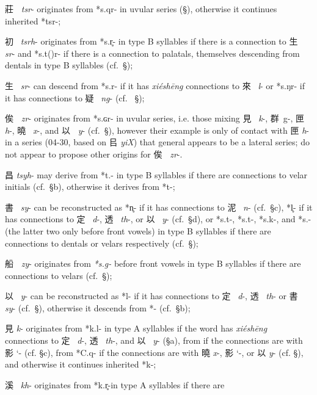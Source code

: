 \begin{description}
莊\textbf{~} \emph{tsr}- originates from *s.q{}r- in uvular
series (§), otherwise it continues inherited *tsr-;
\item
初~ \emph{tsrh}- originates from *s.r̥- in type B syllables if there is a
con­nec­tion to 生~ \emph{sr}- and *s.t{}({})r- if there is a connection to
palatals, themselves descending from dentals in type B syllables
(cf.~§);
\item
生~ \emph{sr}- can descend from *s.r- if it has \emph{xiéshēng
}con­nec­tions to 來~ \emph{l}- or *s.ŋr- if it has con­nec­tions to
疑~ \emph{ng}- (cf. ~§);
\item
俟\textbf{~} \emph{zr}- originates from *s.ɢr- in uvular series,
i.e. those mixing 見~ \emph{k}-, 群~g-, 匣~ \emph{h}-, 曉~ \emph{x}-, and
以\textbf{~} \emph{y}- (cf.~§), however their example is only of
contact with 匣 \emph{h}- in a series (04-30, based on 㠯 \emph{yiX})
that general appears to be a lateral series; 
\citet[]{Baxter2014OldChinese}
do not appear to propose other origins for 俟\textbf{~} \emph{zr}-.
\item
昌 \emph{tsyh}- may derive from *t.{}- in type B syllables if there are
connections to velar initials (cf.~§b), otherwise it derives from *t-;
\item
書~ \emph{sy}- can be re­con­structed as *n̥- if it has con­nec­tions to
泥~ \emph{n}- (cf.~§c), *l̥- if it has con­nec­tions to 定~ \emph{d}-,
透~ \emph{th}-, or 以~ \emph{y}- (cf.~§d), or *s.t-, *s.t{}-, *s.k-, and
*s.{}- (the latter two only before front vowels) in type B syllables if
there are connections to dentals or velars respectively (cf.~§);
\item
船\textbf{~} \emph{zy}-\emph{ }originates from \emph{*s.g-
}before front vowels in type B syllables if there are con­nec­tions to
velars (cf.~§);
\item
以~ \emph{y}- can be re­con­struct­ed as *l- if it has con­nec­tions to
定~ \emph{d}-, 透~ \emph{th}- or 書~ \emph{sy}- (cf.~§), otherwise it
descends from *{}- (cf.~§b);
\item
見  \emph{k}- originates from *k.l{}- in type A syllables if the word has
 \emph{xiéshēng} connections to 定~ \emph{d}-, 透~ \emph{th}-, and
以~ \emph{y}- (§a), from {} if the connections are with 影 `- (cf.
§c), from *C.q{}- if the connections are with 曉  \emph{x}-, 影 `-, or 以
 \emph{y}- (cf. §), and otherwise it continues inherited *k-;
\item
溪~ \emph{kh}- originates from *k.r̥{}-in type A syllables if there are

\end{description}
